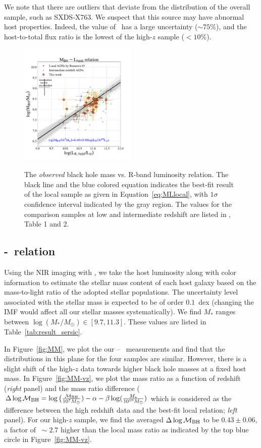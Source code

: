 \documentclass[apj]{emulateapj}
\begin{document}
We note that there are outliers that deviate from the distribution of the overall sample, such as SXDS-X763. We suspect that this source may have abnormal host properties. Indeed, the value of \Reff\ has a large uncertainty ($\sim 75\%$), and the host-to-total flux ratio is the lowest of the high-$z$ sample ($<10\%$). 

\begin{figure}
\centering
{\includegraphics[width=0.5\textwidth]{fig/MBH-L_obs.pdf}}
\caption{\label{fig:ML} 
The {\it observed} black hole mass vs. R-band luminosity relation. The black line and the blue colored equation indicates the best-fit result of the local sample as given in Equation~\ref{eq:MLlocal}, with $1\sigma$ confidence interval indicated by the gray region. The values for the comparison samples at low and intermediate redshift are listed in \citet{Ding2017b}, Table 1 and 2.
}
\end{figure} 

\subsection{\mbh-\smass\ relation}\label{sec:mm}

Using the NIR imaging with \hst, we take the host luminosity along with color information to estimate the stellar mass content of each host galaxy based on the mass-to-light ratio of the adopted stellar populations. The uncertainty level associated with the stellar mass is expected to be of order $0.1$~dex (changing the IMF would affect all our stellar masses systematically). We find $M_*$ ranges between $\log (M_*/M_{\odot}) \in [9.7, 11.3]$. These values are listed in Table~\ref{tab:result_sersic}. 

In Figure~\ref{fig:MM}, we plot the our \mbh -- \smass\ measurements and find that the distributions in this plane for the four samples are similar. However, there is a slight shift of the high-$z$ data towards higher black hole masses at a fixed host mass. In Figure~\ref{fig:MM-vz}, we plot the mass ratio as a function of redshift ({\it right} panel) and the mass ratio difference ($\Delta \log \mathcal M_{\rm BH} = \log \big( \frac{\mathcal M_{\rm  BH}}{10^{7}M_{\odot}}) -\alpha-\beta\log(\frac{M_*}{10^{10}M_{\odot}})$ which is considered as the difference between the high redshift data and the best-fit local relation; {\it left} panel). For our high-$z$ sample, we find the averaged $\Delta \log \mathcal M_{\rm BH}$ to be $0.43\pm0.06$, a factor of $~\sim2.7$ higher than the local mass ratio as indicated by the top blue circle in Figure~\ref{fig:MM-vz}.
\end{document}
